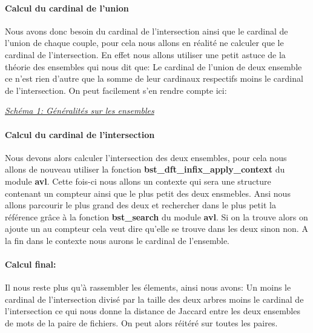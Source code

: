 \documentclass{article}
\begin{document}
\paragraph{Calcul du cardinal de l'union}
Nous avons donc besoin du cardinal de l'intersection ainsi que le cardinal de l'union de chaque couple,
pour cela nous allons en réalité ne calculer que le cardinal de l'intersection. En effet nous allons utiliser
une petit astuce de la théorie des ensembles qui nous dit que: Le cardinal de l'union de deux ensemble ce n'est rien d'autre
que la somme de leur cardinaux respectifs moins le cardinal de l'intersection. On peut facilement s'en rendre compte ici:

\begin{center}
\end{center}
\begin{center}
  \colorbox{lightgray!20}{\textit{\underline{Schéma 1: Généralités sur les ensembles}}}
\end{center}

\paragraph{Calcul du cardinal de l'intersection}
Nous devons alors calculer l'intersection des deux ensembles, pour cela nous allons de nouveau
utiliser la fonction \textbf{bst\_dft\_infix\_apply\_context} du module \textbf{avl}. Cette fois-ci 
nous allons un contexte qui sera une structure contenant un compteur ainsi que le plus petit des deux 
ensmebles. Ansi nous allons parcourir le plus grand des deux et rechercher dans le plus petit la référence 
grâce à la fonction \textbf{bst\_search} du module \textbf{avl}. Si on la trouve alors on ajoute un au compteur
cela veut dire qu'elle se trouve dans les deux sinon non. A la fin dans le contexte nous aurons le cardinal de l'ensemble.

\paragraph{Calcul final:}
Il nous reste plus qu'à rassembler les élements, ainsi nous avons:
Un moins le cardinal de l'intersection divisé par la taille des deux arbres moins le cardinal de l'intersection ce qui nous donne
la distance de Jaccard entre les deux ensembles de mots de la paire de fichiers. On peut alors réitéré sur toutes les paires.
\end{document}
